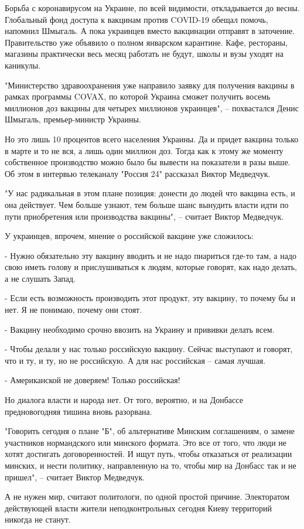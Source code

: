 Борьба с коронавирусом на Украине, по всей видимости, откладывается до весны.
Глобальный фонд доступа к вакцинам против COVID-19 обещал помочь, напомнил
Шмыгаль. А пока украинцев вместо вакцинации отправят в заточение. Правительство
уже объявило о полном январском карантине. Кафе, рестораны, магазины
практически весь месяц работать не будут, школы и вузы уходят на каникулы.

"Министерство здравоохранения уже направило заявку для получения вакцины в
рамках программы COVAX, по которой Украина сможет получить восемь миллионов доз
вакцины для четырех миллионов украинцев", – похвастался Денис Шмыгаль,
премьер-министр Украины.

Но это лишь 10 процентов всего населения Украины. Да и придет вакцина только в
марте и то не вся, а лишь один миллион доз. Тогда как к этому же моменту
собственное производство можно было бы вывести на показатели в разы выше. Об
этом в интервью телеканалу "Россия 24" рассказал Виктор Медведчук.

"У нас радикальная в этом плане позиция: донести до людей что вакцина есть, и
она действует. Чем больше узнают, тем больше шанс вынудить власти идти по пути
приобретения или производства вакцины", – считает Виктор Медведчук.

У украинцев, впрочем, мнение о российской вакцине уже сложилось:

- Нужно обязательно эту вакцину вводить и не надо пиариться где-то там, а надо
свою иметь голову и прислушиваться к людям, которые говорят, как надо делать, а
не слушать Запад.

- Если есть возможность производить этот продукт, эту вакцину, то почему бы и
нет. Я не понимаю, почему они стоят.

- Вакцину необходимо срочно ввозить на Украину и прививки делать всем.

- Чтобы делали у нас только российскую вакцину. Сейчас выступают и говорят, что
и ту, и ту, но не российскую. А для нас российская – самая лучшая.

- Американской не доверяем! Только российская!

Но диалога власти и народа нет. От того, вероятно, и на Донбассе предновогодняя
тишина вновь разорвана.

"Говорить сегодня о плане "Б", об альтернативе Минским соглашениям, о замене
участников нормандского или минского формата. Это все от того, что люди не
хотят достигать договоренностей. И ищут путь, чтобы отказаться от реализации
минских, и нести политику, направленную на то, чтобы мир на Донбасс так и не
пришел", – считает Виктор Медведчук.

А не нужен мир, считают политологи, по одной простой причине. Электоратом
действующей власти жители неподконтрольных сегодня Киеву территорий никогда не
станут.

